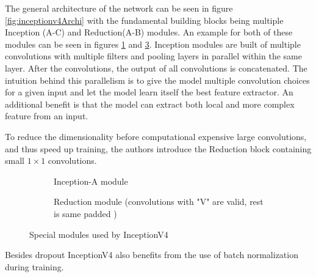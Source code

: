 The general architecture of the network can be seen in figure \ref{fig:inceptionv4Archi} with the fundamental building blocks being multiple Inception (A-C) and Reduction(A-B) modules. 
An example for both of these modules can be seen in figures \ref{fig:InceptionA} and \ref{fig:InceptionReduction}.
Inception modules are built of multiple convolutions with multiple filters and pooling layers in parallel within the same layer.
After the convolutions, the output of all convolutions is concatenated.
The intuition behind this parallelism is to give the model multiple convolution choices for a given input and let the model learn itself the best feature extractor. An additional benefit is that the model can extract both local and more complex feature from an input.

To reduce the dimensionality before computational expensive large convolutions, and thus speed up training, the authors introduce the Reduction block containing small $1\times1$ convolutions.   %




\begin{figure}[!htb]
\centering
\begin{subfigure}[b]{.95\textwidth}
\centering
   \resizebox{.8\linewidth}{!}{}
   \caption{Inception-A module}
   \label{fig:InceptionA} 
\end{subfigure}

\vspace{1em}
\begin{subfigure}[b]{.95\textwidth}
\centering
   \resizebox{.6\linewidth}{!}{}
   \caption{Reduction module (convolutions with "V" are valid, rest is same padded )}
   \label{fig:InceptionReduction}
\end{subfigure}

\caption{Special modules used by InceptionV4}

\end{figure}




Besides dropout InceptionV4 also benefits from the use of batch normalization during training.


